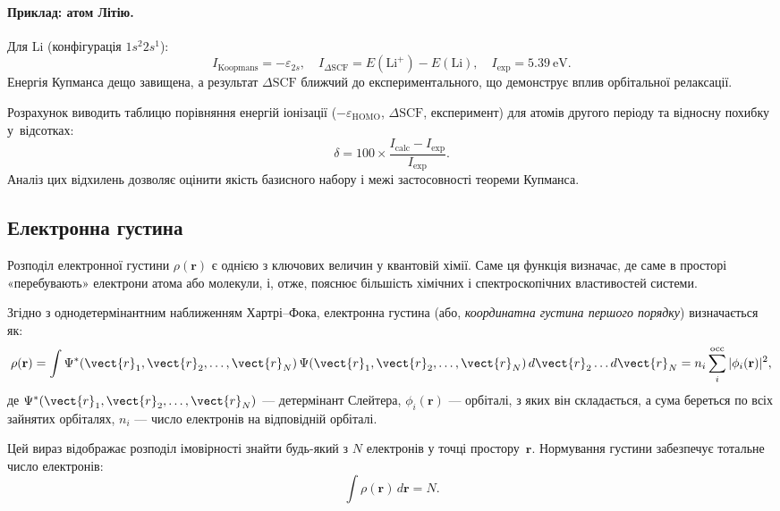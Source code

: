 \paragraph{Приклад: атом Літію.}
Для Li (конфігурація \(1s^2 2s^1\)):
\[
I_{\text{Koopmans}} = -\varepsilon_{2s},
\quad
I_{\Delta\mathrm{SCF}} = E(\mathrm{Li}^+) - E(\mathrm{Li}),
\quad
I_\text{exp} = 5.39~\text{eV}.
\]
Енергія Купманса дещо завищена, а результат \(\Delta\mathrm{SCF}\) ближчий до експериментального, що демонструє вплив орбітальної релаксації.




\begin{commentbox}
Розрахунок виводить таблицю порівняння енергій іонізації (\(-\varepsilon_\mathrm{HOMO}\), \(\Delta\mathrm{SCF}\), експеримент) для атомів другого періоду
та відносну похибку у~відсотках:
\[
\delta = 100 \times \frac{I_\text{calc} - I_\text{exp}}{I_\text{exp}}.
\]
Аналіз цих відхилень дозволяє оцінити якість базисного набору і межі застосовності теореми Купманса.
\end{commentbox}



\subsection{Електронна густина}

Розподіл електронної густини $\rho(\mathbf{r})$ є однією з ключових величин у квантовій хімії.
Саме ця функція визначає, де саме в просторі «перебувають» електрони атома або молекули, і, отже, пояснює більшість хімічних і спектроскопічних властивостей системи.

Згідно з однодетермінантним наближенням Хартрі–Фока, електронна густина (або, \emph{координатна густина першого порядку}) визначається як:
\begin{equation}\label{eq:rho_int}
    \rho(\mathbf{r}) = \int \Psi^*(\vect{r}_1,\vect{r}_2,\ldots,\vect{r}_N)\,
       \Psi(\vect{r}_1,\vect{r}_2,\ldots,\vect{r}_N)\, d\vect{r}_2\ldots d\vect{r}_N = n_i \sum_{i}^{\text{occ}} |\phi_i(\mathbf{r})|^2,
\end{equation}
де $\Psi^*(\vect{r}_1,\vect{r}_2,\ldots,\vect{r}_N)$ --- детермінант Слейтера, $\phi_i(\mathbf{r})$ --- орбіталі, з яких він складається, а сума береться по всіх зайнятих орбіталях, $n_i$ --- число електронів на відповідній орбіталі.


Цей вираз відображає розподіл імовірності знайти будь-який
з $N$ електронів у точці простору~$\mathbf{r}$.
Нормування густини забезпечує тотальне число електронів:
\begin{equation}\label{eq:int-rho=N}
\int \rho(\mathbf{r})\, d\mathbf{r} = N.
\end{equation}


